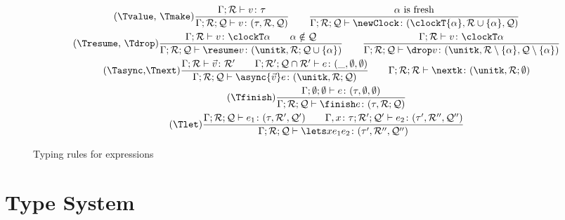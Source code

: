 \begin{figure}[t]
 \begin{gather*}
    \tag{\Tvalue, \Tmake}
    \frac{
      \Gamma; \mathcal R \vdash v \colon \tau
    }{
      \Gamma; \mathcal R; \mathcal Q
      \vdash v \colon (\tau, \mathcal R, \mathcal Q) 
    }
    \qquad
    \frac{
      \alpha \text{ is fresh}
    }{
      \Gamma; \mathcal R; \mathcal Q
      \vdash \newClock \colon (\clockT{\alpha}, \mathcal R \cup
      \{\alpha\}, \mathcal Q)
    }
    \\
   \tag{\Tresume, \Tdrop}
    \frac{
      \Gamma; \mathcal R
      \vdash v \colon \clockT \alpha
      \qquad
      \alpha \notin \mathcal Q
    }{
      \Gamma; \mathcal R; \mathcal Q
      \vdash \resume v \colon (\unitk, \mathcal R; \mathcal Q \cup \{\alpha\})
    }
    \qquad
    \frac{
      \Gamma; \mathcal R
      \vdash v \colon \clockT \alpha
    }{
      \Gamma; \mathcal R; \mathcal Q
      \vdash \drop v \colon (\unitk, \mathcal R \setminus \{\alpha\}, \mathcal Q \setminus \{\alpha\})
    }
    \\
   \tag{\Tasync,\Tnext}
   \frac{
     \Gamma; \mathcal R
     \vdash \vec v \colon \mathcal R'
\qquad
     \Gamma; \mathcal R'; \mathcal {Q} \cap \mathcal R'
     \vdash e \colon (\_, \emptyset, \emptyset)
   }{
     \Gamma; \mathcal R; \mathcal Q
     \vdash \async {\vec v} e \colon (\unitk, \mathcal R; \mathcal Q)
   }
   \qquad
   \Gamma; \mathcal R; \mathcal R
    \vdash \nextk \colon (\unitk, \mathcal R; \emptyset)
\\
   \tag{\Tfinish}
   \frac{
     \Gamma; \emptyset; \emptyset \vdash e \colon (\tau,
     \emptyset, \emptyset)
   }{
     \Gamma; \mathcal R; \mathcal Q
     \vdash \finish e \colon (\tau, \mathcal R; \mathcal Q)
   }
  \\
   \tag{\Tlet}
   \frac{
     \Gamma; \mathcal R; \mathcal Q \vdash e_1 \colon (\tau,
     \mathcal{R'}, \mathcal{Q'})
     \qquad
     \Gamma, x \colon \tau; \mathcal{R'}; \mathcal{Q'} \vdash
     e_2 \colon (\tau', \mathcal{R''}, \mathcal{Q''})
   }{
     \Gamma; \mathcal R; \mathcal Q
     \vdash \lets x {e_1} {e_2} \colon (\tau', \mathcal {R''},
     \mathcal {Q''})
   }
 \end{gather*}
 \caption{Typing rules for expressions}
 \label{fig:typing-expressions}
\end{figure}

 
\section{Type System}
\label{sec:type-system}

